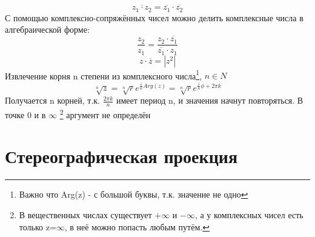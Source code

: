 \documentclass{article}
\begin{document}
            \begin{equation}\label{complex_conjugate}
               \overline{z_{1} \cdot z_{2}}=\overline{z_{1}} \cdot \overline{z_{2}}              
            \end{equation}
            С помощью комплексно-сопряжённых чисел можно делить комплексные числа в алгебраической форме:
            \begin{equation}
               \frac{ z_{2} }{ z_{1} } = \frac{ z_{2} \cdot \overline{ z_{1} }}{ \overline{z_{1}} \cdot z_{1} }
            \end{equation}
            \begin{equation}
               z \cdot \overline{z}=|z^{2}|
            \end{equation}
          Извлечение корня n степени из комплексного числа\footnote{Важно что Arg(z) - с большой буквы, т.к. значение не одно}, $n \in N $
            \begin{equation}
              \sqrt[n]{z}=\sqrt[n]{r} e^{\frac{i}{n} Arg(z)}=\sqrt[n]{r} e^{\frac{i}{n} \phi + 2 \pi k}
            \end{equation}
          Получается n корней, т.к. $\frac{2 \pi k}{n}$ имеет период n, и значения начнут повторяться. В точке 0 и в $\infty$ \footnote{
              В вещественных числах существует $+ \infty$ и $- \infty$, а у комплексных чисел есть только z=$\infty$, в неё можно попасть любым путём.
            } аргумент не определён
            \newpage
        \section{Стереографическая проекция}
\end{document}
